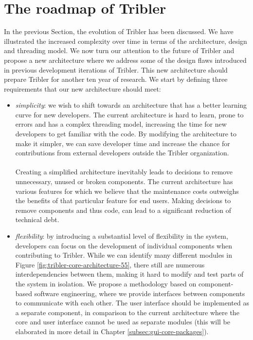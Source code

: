 \section{The roadmap of Tribler}
\label{sec:tribler-roadmap}
In the previous Section, the evolution of Tribler has been discussed. We have illustrated the increased complexity over time in terms of the architecture, design and threading model. We now turn our attention to the future of Tribler and propose a new architecture where we address some of the design flaws introduced in previous development iterations of Tribler. This new architecture should prepare Tribler for another ten year of research. We start by defining three requirements that our new architecture should meet:
\begin{itemize}
	\item \emph{simplicity}: we wish to shift towards an architecture that has a better learning curve for new developers. The current architecture is hard to learn, prone to errors and has a complex threading model, increasing the time for new developers to get familiar with the code. By modifying the architecture to make it simpler, we can save developer time and increase the chance for contributions from external developers outside the Tribler organization.\\\\
	Creating a simplified architecture inevitably leads to decisions to remove unnecessary, unused or broken components. The current architecture has various features for which we believe that the maintenance costs outweighs the benefits of that particular feature for end users. Making decisions to remove components and thus code, can lead to a significant reduction of technical debt.
	\item \emph{flexibility}: by introducing a substantial level of flexibility in the system, developers can focus on the development of individual components when contributing to Tribler. While we can identify many different modules in Figure \ref{fig:tribler-core-architecture-55}, there still are numerous interdependencies between them, making it hard to modify and test parts of the system in isolation. We propose a methodology based on component-based software engineering, where we provide interfaces between components to communicate with each other. The user interface should be implemented as a separate component, in comparison to the current architecture where the core and user interface cannot be used as separate modules (this will be elaborated in more detail in Chapter \ref{subsec:gui-core-packages}).

\end{itemize}
